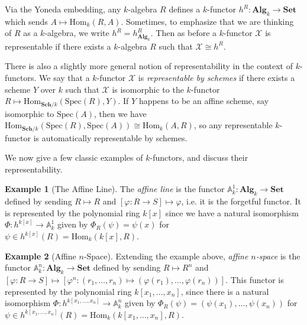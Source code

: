 \documentclass[oneside,11pt]{amsart}
\newcommand{\aaa}{\ensuremath{\mathbb{A}}}
\newcommand{\bSet}{\ensuremath{\textbf{Set}}}
\newcommand{\bAlg}{\ensuremath{\textbf{Alg}}}
\newcommand{\bSch}{\ensuremath{\textbf{Sch}}}
\newcommand{\mX}{\ensuremath{\mathcal{X}}}
\newcommand{\Hom}{\ensuremath{\text{Hom}}}
\newcommand{\Spec}{\ensuremath{\text{Spec}}}
\theoremstyle{definition}
\newtheorem{example}{Example}
\newtheorem{proof techniques}{Proof Techniques}
\begin{document}
Via the Yoneda embedding, any $k$-algebra $R$ defines a $k$-functor $h^R: \bAlg_k \to \bSet$ which sends $A \mapsto \Hom_k(R , A)$. Sometimes, to emphasize that we are thinking of $R$ as a $k$-algebra, we write $h^R = h^R_{\bAlg_k}$. Then as before a $k$-functor $\mX$ is representable if there exists a $k$-algebra $R$ such that $\mX \cong h^R$. 

There is also a slightly more general notion of representability in the context of $k$-functors. We say that a $k$-functor $\mX$ is \emph{representable by schemes} if there exists a scheme $Y$ over $k$ such that $\mX$ is isomorphic to the $k$-functor $R \mapsto \Hom_{\bSch / k}( \Spec(R) , Y)$. If $Y$ happens to be an affine scheme, say isomorphic to $\Spec(A)$, then we have $\Hom_{\bSch / k}( \Spec(R) , \Spec(A)) \cong \Hom_k(A , R)$, so any representable $k$-functor is automatically representable by schemes. 

We now give a few classic examples of $k$-functors, and discuss their representability. 

\begin{example}[The Affine Line]
The \emph{affine line} is the functor $\aaa^1_k : \bAlg_k \to \bSet$ defined by sending $R \mapsto R$ and $[\varphi : R \to S] \mapsto \varphi$, i.e. it is the forgetful functor. It is represented by the polynomial ring $k[x]$ since we have a natural isomorphism $\Phi: h^{k[x]} \to \aaa^1_k$ given by $\Phi_R( \psi ) = \psi(x)$ for $\psi \in h^{k[x]}(R) = \Hom_k(k[x] , R)$. 
\end{example}

\begin{example}[Affine $n$-Space]
Extending the example above, \emph{affine $n$-space} is the functor $\aaa^n_k : \bAlg_k \to \bSet$ defined by sending $R \mapsto R^n$ and $[\varphi : R \to S] \mapsto [\varphi^n : (r_1, \ldots, r_n) \mapsto (\varphi(r_1), \ldots, \varphi(r_n)) ]$. This functor is represented by the polynomial ring $k[x_1, \ldots, x_n]$, since there is a natural isomorphism $\Phi: h^{k[x_1, \ldots, x_n]} \to \aaa^n_k$ given by $\Phi_R( \psi ) = ( \psi(x_1), \ldots, \psi(x_n) )$ for $\psi \in h^{k[x_1, \ldots, x_n]}(R) = \Hom_k(k[x_1, \ldots, x_n] , R)$. 
\end{example}
\end{document}
